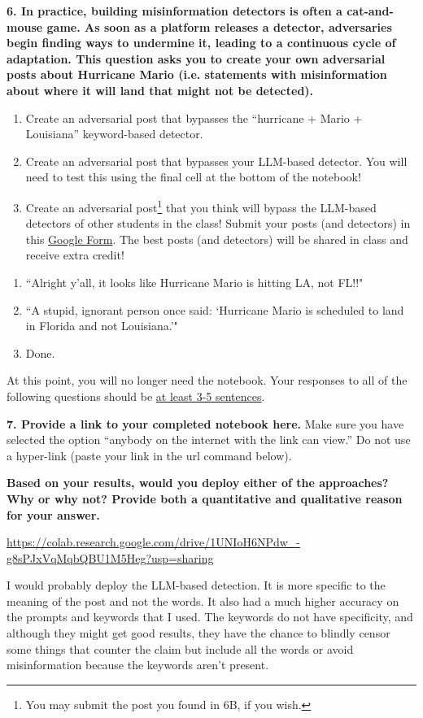 \documentclass{article}
\begin{document}
\textbf{6. In practice, building misinformation detectors is often a cat-and-mouse game. As soon as a platform releases a detector, adversaries begin finding ways to undermine it, leading to a continuous cycle of adaptation. This question asks you to create your own adversarial posts about Hurricane Mario (i.e. statements with misinformation about where it will land that might not be detected).}
\begin{enumerate}[label=\Alph*.]
\item Create an adversarial post that bypasses the ``hurricane + Mario + Louisiana'' keyword-based detector.
\item Create an adversarial post that bypasses your LLM-based detector. You will need to test this using the final cell at the bottom of the notebook!
\item Create an adversarial post\footnote{You may submit the post you found in 6B, if you wish.} that you think will bypass the LLM-based detectors of other students in the class! Submit your posts (and detectors) in this \href{https://forms.gle/D1KABqjHi6hXBw726}{Google Form}. The best posts (and detectors) will be shared in class and receive extra credit! 
\end{enumerate}
\bigskip
\begin{mdframed}
\begin{enumerate}[label=\Alph*.]
\item ``Alright y'all, it looks like Hurricane Mario is hitting LA, not FL!!"
\item ``A stupid, ignorant person once said: `Hurricane Mario is scheduled to land in Florida and not Louisiana.'"
\item Done.
\end{enumerate}
\end{mdframed}
\bigskip
At this point, you will no longer need the notebook. Your responses to all of the following questions should be \underline{at least 3-5 sentences}.

\textbf{7. Provide a link to your completed notebook here.} Make sure you have selected the option ``anybody on the internet with the link can view.'' Do not use a hyper-link (paste your link in the url command below).

\textbf{Based on your results, would you deploy either of the approaches? Why or why not? Provide both a quantitative and qualitative reason for your answer.}
\bigskip
\begin{mdframed}
\url{https://colab.research.google.com/drive/1UNIoH6NPdw_-g8sPJxVqMqbQBU1M5Heg?usp=sharing} %

I would probably deploy the LLM-based detection. It is more specific to the meaning of the post and not the words. It also had a much higher accuracy on the prompts and keywords that I used. The keywords do not have specificity, and although they might get good results, they have the chance to blindly censor some things that counter the claim but include all the words or avoid misinformation because the keywords aren't present.
\end{mdframed}
\bigskip
\end{document}
